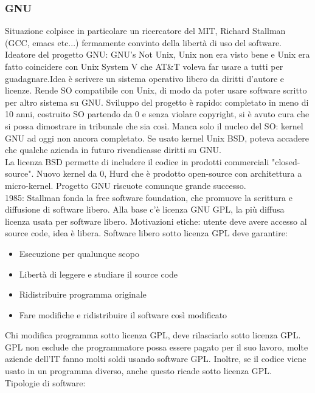 \documentclass[12pt, oneside]{extbook}
\begin{document}
\subsubsection{GNU}
Situazione colpisce in particolare un ricercatore del MIT, Richard Stallman (GCC, emacs etc...) fermamente convinto della libertà di uso del software. Ideatore del progetto GNU: GNU's Not Unix, Unix non era visto bene e Unix era fatto coincidere con Unix System V che AT\&T voleva far usare a tutti per guadagnare.Idea è scrivere un sistema operativo libero da diritti d'autore e licenze. Rende SO compatibile con Unix, di modo da poter usare software scritto per altro sistema su GNU. Sviluppo del progetto è rapido: completato in meno di 10 anni, costruito SO partendo da 0 e senza violare copyright, si è avuto cura che si possa dimostrare in tribunale che sia così. Manca solo il nucleo del SO: kernel GNU ad oggi non ancora completato. Se usato kernel Unix BSD, poteva accadere che qualche azienda in futuro rivendicasse diritti su GNU.\\ La licenza BSD permette di includere il codice in prodotti commerciali "closed-source". Nuovo kernel da 0, Hurd che è prodotto open-source con architettura a micro-kernel. Progetto GNU riscuote comunque grande successo.\\ 1985: Stallman fonda la free software foundation, che promuove la scrittura e diffusione di software libero. Alla base c'è licenza GNU GPL, la più diffusa licenza usata per software libero. Motivazioni etiche: utente deve avere accesso al source code, idea è libera. Software libero sotto licenza GPL deve garantire:
\begin{itemize}
\item Esecuzione per qualunque scopo
\item Libertà di leggere e studiare il source code
\item Ridistribuire programma originale
\item Fare modifiche e ridistribuire il software così modificato
\end{itemize}
Chi modifica programma sotto licenza GPL, deve rilasciarlo sotto licenza GPL. GPL non esclude che programmatore possa essere pagato per il suo lavoro, molte aziende dell'IT fanno molti soldi usando software GPL. Inoltre, se il codice viene usato in un programma diverso, anche questo ricade sotto licenza GPL.\\ Tipologie di software:
\end{document}
